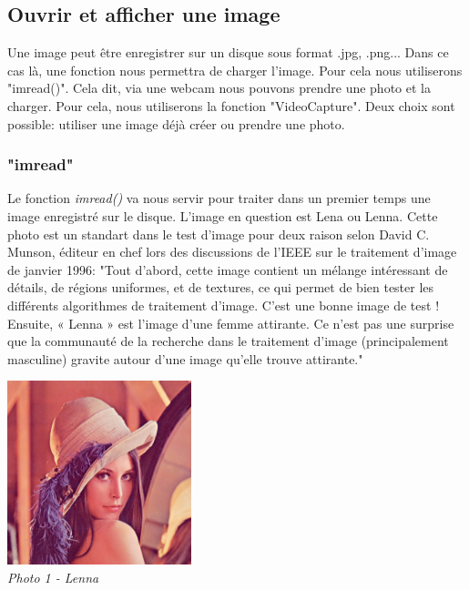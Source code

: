 \documentclass[12pt, french]{report}
\begin{document}
        \subsection{Ouvrir et afficher une image}
                Une image peut être enregistrer sur un disque sous format .jpg, .png... Dans ce cas là, une fonction nous permettra de charger l'image. Pour cela nous utiliserons "imread()". Cela dit, via une webcam nous pouvons prendre une photo et la charger. Pour cela, nous utiliserons la fonction "VideoCapture". Deux choix sont possible: utiliser une image déjà créer ou prendre une photo.


                \subsubsection{"imread"}
                Le fonction \textit{imread()} va nous servir pour traiter dans un premier temps une image enregistré sur le disque.
                L'image en question est Lena ou Lenna.
                Cette photo est un standart dans le test d'image pour deux raison selon David C. Munson, éditeur en chef lors des discussions de l'IEEE sur le traitement d'image de janvier 1996: 
                "Tout d'abord, cette image contient un mélange intéressant de détails, de régions uniformes, et de textures, ce qui permet de bien tester les différents algorithmes de traitement d'image. C'est une bonne image de test ! Ensuite, « Lenna » est l'image d'une femme attirante. Ce n'est pas une surprise que la communauté de la recherche dans le traitement d'image (principalement masculine) gravite autour d'une image qu'elle trouve attirante." 
                \begin{center}
                        \includegraphics[width=0.4\textwidth]{Images/Lenna.png}\\
                        \textit{Photo 1 - Lenna}\\
                \end{center}
\end{document}
